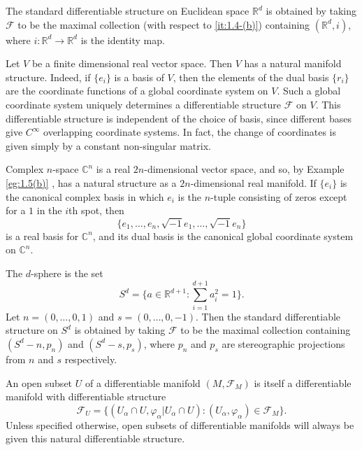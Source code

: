 \begin{examples}\label{thm:1.5}
	\begin{enumerate}
		 The standard differentiable structure on Euclidean space $\mathbb{R}^d$
		is obtained by taking $\mathcal{F}$ to be the maximal collection
		(with respect to \ref{it:1.4-(b)})
		containing $(\mathbb{R}^d, i)$, where $i: \mathbb{R}^d \to \mathbb{R}^d$
		is the identity map.

		\label{eg:1.5(b)} Let $V$ be a finite dimensional real vector space.
		Then $V$ has a natural manifold structure. Indeed, if $\{e_i\}$
		is a basis of $V$, then the elements of the dual basis $\{r_i\}$ are
		the coordinate functions of a global coordinate system on $V$. Such a global
		coordinate system uniquely determines a differentiable structure
		$\mathcal{F}$ on $V$. This differentiable structure is independent of
		the choice of basis, since different bases give $C^\infty$ overlapping
		coordinate systems. In fact, the change of coordinates is
		given simply by a constant non-singular matrix.

		 Complex $n$-space $\mathbb{C}^{n}$ is a real $2n$-dimensional vector space, and so,
		by Example \ref{eg:1.5(b)} ,
		has a natural structure as a $2n$-dimensional real manifold.
		If $\{e_{i}\}$ is the canonical complex basis in which $e_{i}$ is
		the $n$-tuple consisting of zeros except for a $1$ in the $i$th
		spot, then
		\[
			\{e_{1},\ldots,e_{n},\sqrt{-1}e_{1},\ldots,\sqrt{-1}e_{n}\}
		\]
		is a real basis for $\mathbb{C}^{n}$, and its dual basis is the canonical
		global coordinate system on $\mathbb{C}^{n}$.

		 The $d$-sphere is the set 
		\[
			S^{d}=\{a\in\mathbb{R}^{d+1}\colon\sum_{i=1}^{d+1}a_{i}^{2}=1\}.
		\]
		Let $n = (0, \ldots, 0, 1)$ and $s = (0, \ldots, 0, -1)$. Then the
		standard differentiable structure on $S^d$ is obtained by taking
		$\mathcal{F}$ to be the maximal collection containing $(S^d - n, p_n)$
		and $(S^d - s, p_s)$, where $p_n$ and $p_s$ are stereographic
		projections from $n$ and $s$ respectively.

		 An open subset $U$ of a differentiable manifold
		$(M,\mathcal{F}_{M})$ is itself a differentiable manifold
		with differentiable structure
		\[
			\mathcal{F}_{U}=\{(U_{\alpha}\cap U,\varphi_{\alpha}\big|U_{\alpha}\cap U)\colon(U_{\alpha},\varphi_{\alpha})\in\mathcal{F}_{M}\}.
		\]
		Unless specified otherwise, open subsets of differentiable
		manifolds will always be given this natural differentiable structure.


\end{enumerate}
\end{examples}
